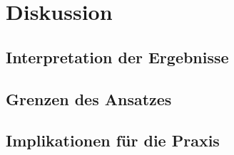 \chapter{Diskussion}

\section{Interpretation der Ergebnisse}
\section{Grenzen des Ansatzes}
\section{Implikationen für die Praxis}
